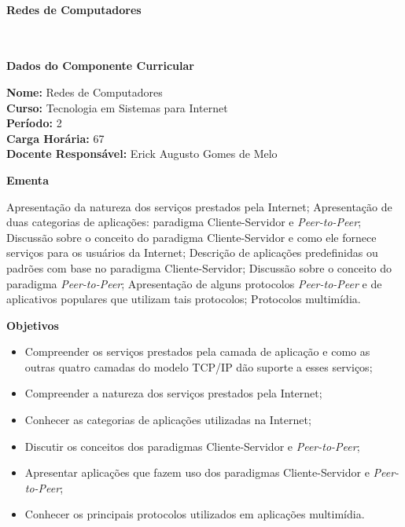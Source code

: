 \paragraph{Redes de Computadores} \


\begin{snugshade}\begin{center}\textbf{
	Dados do Componente Curricular
}\end{center}\end{snugshade}

\noindent 	\textbf{Nome:} Redes de Computadores
\\ 			\textbf{Curso:} Tecnologia em Sistemas para Internet
\\ 			\textbf{Período:} \unit{2}{\degree}
\\ 			\textbf{Carga Horária:} \unit{67}{\hour}
\\ 			\textbf{Docente Responsável:} Erick Augusto Gomes de Melo


\begin{snugshade}\begin{center}\textbf{
    Ementa
\vphantom{q}}\end{center}\end{snugshade}

\noindent
Apresentação da natureza dos serviços prestados pela Internet; Apresentação de duas categorias de aplicações: paradigma Cliente-Servidor e \textit{Peer-to-Peer}; Discussão sobre o conceito do paradigma Cliente-Servidor e como ele fornece serviços para os usuários da Internet; Descrição de aplicações predefinidas ou padrões com base no paradigma Cliente-Servidor; Discussão sobre o conceito do paradigma \textit{Peer-to-Peer}; Apresentação de alguns protocolos \textit{Peer-to-Peer} e de aplicativos populares que utilizam tais protocolos; Protocolos multimídia.

\begin{snugshade}\begin{center}\textbf{
    Objetivos
}\end{center}\end{snugshade}


\begin{itemize}

\item Compreender os serviços prestados pela camada de aplicação e como as outras quatro camadas do modelo TCP/IP dão suporte a esses serviços;
\item Compreender a natureza dos serviços prestados pela Internet;
\item Conhecer as categorias de aplicações utilizadas na Internet;
\item Discutir os conceitos dos paradigmas Cliente-Servidor e \textit{Peer-to-Peer};
\item Apresentar aplicações que fazem uso dos paradigmas Cliente-Servidor e \textit{Peer-to-Peer};
\item Conhecer os principais protocolos utilizados em aplicações multimídia.

\end{itemize} 

